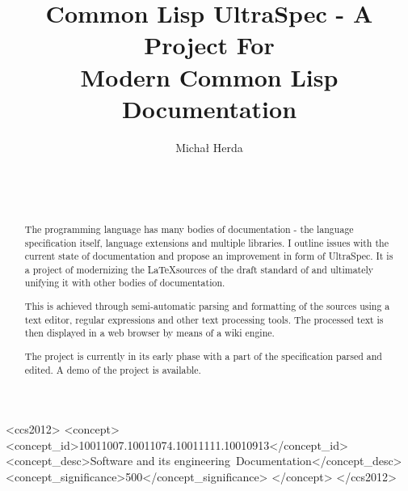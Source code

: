 \documentclass{sig-alternate-05-2015}
\def\inputtex#1{}
\begin{document}
\title{Common Lisp UltraSpec - A Project For \\ Modern Common Lisp Documentation}
\author{\alignauthor
Michał Herda\\
\\
\\
\\
}


\maketitle

\begin{abstract}
The \cl{} programming language has many bodies of documentation - the language specification\cite{ANSI:1994:standard} itself, language extensions and multiple libraries. I outline issues with the current state of \cl{} documentation and propose an improvement in form of \cl{} UltraSpec. It is a project of modernizing the \LaTeX sources of the draft standard\cite{ANSI:1994:draft} of \cl{} and ultimately unifying it with other bodies of \cl{} documentation.

This is achieved through semi-automatic parsing and formatting of the sources using a text editor, regular expressions and other text processing tools. The processed text is then displayed in a web browser by means of a wiki engine.

The project is currently in its early phase with a part of the specification parsed and edited. A demo of the project is available.
\end{abstract}

\begin{CCSXML}
<ccs2012>
<concept>
<concept_id>10011007.10011074.10011111.10010913</concept_id>
<concept_desc>Software and its engineering~Documentation</concept_desc>
<concept_significance>500</concept_significance>
</concept>
</ccs2012>
\end{CCSXML}


\printccsdesc


\inputtex{sec-introduction.tex}
\inputtex{sec-previous-work.tex}
\inputtex{sec-my-work.tex}
\inputtex{sec-conclusions-and-future-work.tex}



\end{document}
